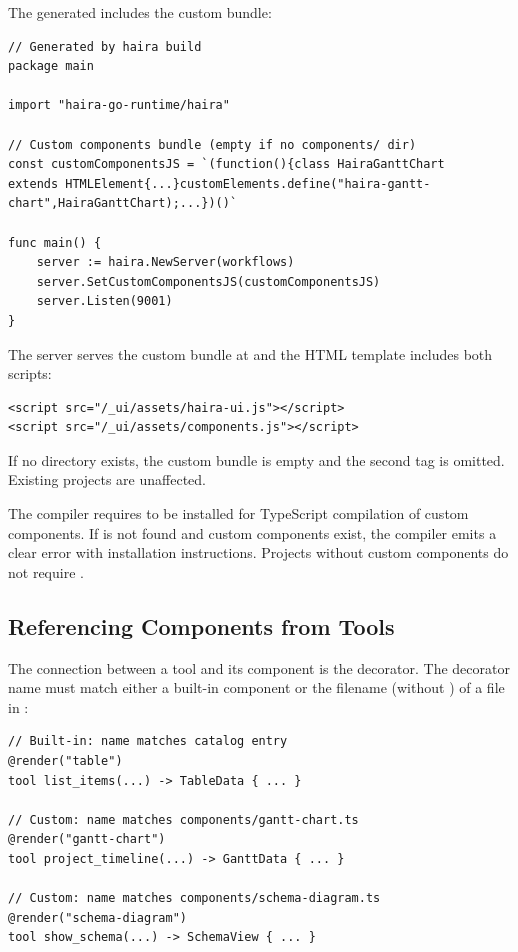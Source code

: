 The generated  includes the custom bundle:

\begin{lstlisting}[language={}]
// Generated by haira build
package main

import "haira-go-runtime/haira"

// Custom components bundle (empty if no components/ dir)
const customComponentsJS = `(function(){class HairaGanttChart
extends HTMLElement{...}customElements.define("haira-gantt-
chart",HairaGanttChart);...})()`

func main() {
    server := haira.NewServer(workflows)
    server.SetCustomComponentsJS(customComponentsJS)
    server.Listen(9001)
}
\end{lstlisting}

The server serves the custom bundle at  and the HTML template includes both scripts:

\begin{lstlisting}[language={}]
<script src="/_ui/assets/haira-ui.js"></script>
<script src="/_ui/assets/components.js"></script>
\end{lstlisting}

If no  directory exists, the custom bundle is empty and the second  tag is omitted. Existing projects are unaffected.

\begin{note}
The compiler requires  to be installed for TypeScript compilation of custom components. If  is not found and custom components exist, the compiler emits a clear error with installation instructions. Projects without custom components do not require .
\end{note}

\subsection{Referencing Components from Tools}

The connection between a tool and its component is the  decorator. The decorator name must match either a built-in component or the filename (without ) of a file in :

\begin{lstlisting}
// Built-in: name matches catalog entry
@render("table")
tool list_items(...) -> TableData { ... }

// Custom: name matches components/gantt-chart.ts
@render("gantt-chart")
tool project_timeline(...) -> GanttData { ... }

// Custom: name matches components/schema-diagram.ts
@render("schema-diagram")
tool show_schema(...) -> SchemaView { ... }
\end{lstlisting}

